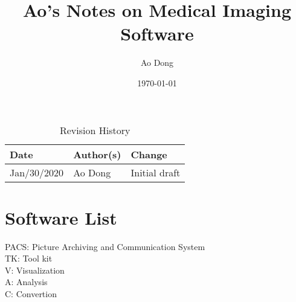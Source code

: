 \documentclass{article}
\title{Ao's Notes on Medical Imaging Software}
\author{Ao Dong}
\date{\today}
\begin{document}
\maketitle

\begin{table}[hp]
\caption{Revision History} \label{TblRevisionHistory}
\begin{tabularx}{\textwidth}{llX}
\toprule
\textbf{Date} & \textbf{Author(s)} & \textbf{Change}\\
\midrule
Jan/30/2020 & Ao Dong & Initial draft\\
\bottomrule
\end{tabularx}
\end{table}

\section*{Software List}
PACS: Picture Archiving and Communication System\\
TK: Tool kit\\
V: Visualization\\
A: Analysis\\
C: Convertion
\end{document}
